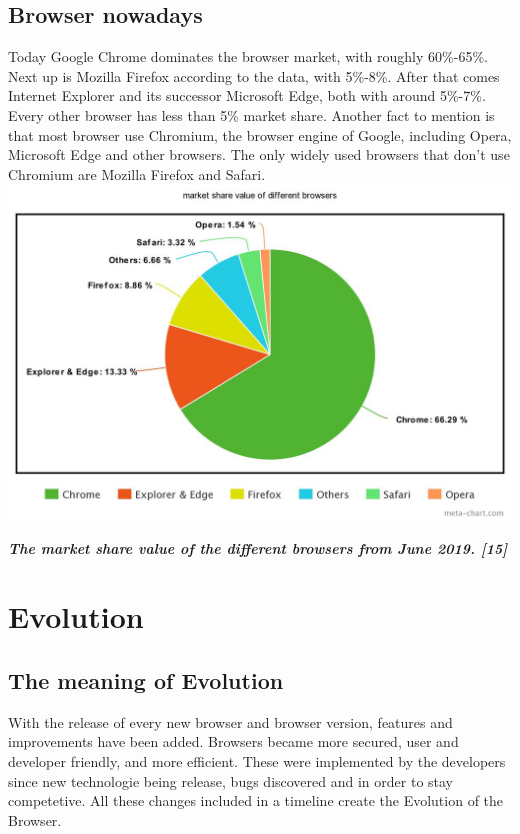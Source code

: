 \documentclass[runningheads]{llncs}
\begin{document}
		\subsection{Browser nowadays}
		Today Google Chrome dominates the browser market, with roughly 60\%-65\%. Next up is Mozilla Firefox according to the data, with 5\%-8\%. After that comes  Internet Explorer and its successor Microsoft Edge, both with around 5\%-7\%. Every other browser has less than 5\% market share. Another fact to mention is that most browser use Chromium, the browser engine of Google, including Opera, Microsoft Edge and other browsers. The only widely used browsers that don't use Chromium are Mozilla Firefox and Safari.\\
		\includegraphics[scale=0.3]{meta-chart.jpeg}\\
		\begin{center}
			\textit{\textbf{The market share value of the different browsers from June 2019. [15]}}
		\end{center}
		
	\section{Evolution}
		\subsection{The meaning of Evolution}
		With the release of every new browser and browser version, features and improvements have been added. Browsers became more secured, user and developer friendly, and more efficient. These were implemented by the developers since new technologie being release, bugs discovered and in order to stay competetive. All these changes included in a timeline create the Evolution of the Browser.
\end{document}
